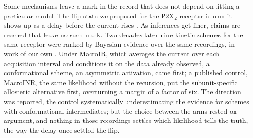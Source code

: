 Some mechanisms leave a mark in the record that does not depend on fitting a particular model. The
flip state we proposed for the P2X$_2$ receptor is one: it shows up as a delay before the current
rises \citep{moffatthume2007responses}. As inferences get finer, claims are reached that leave no
such mark. Two decades later nine kinetic schemes for the same receptor were ranked by Bayesian
evidence over the same recordings, in work of our own \citep{moffatt2025bayesian}. Under MacroIR,
which averages the current over each acquisition interval and conditions it on the data already
observed, a conformational scheme, an asymmetric activation, came first; a published control,
MacroINR, the same likelihood
without the recursion, put the subunit-specific allosteric alternative first, overturning a margin
of a factor of six. The direction was reported, the control systematically underestimating the
evidence for schemes with conformational intermediates; but the choice between the arms rested on
argument, and nothing in those recordings settles which likelihood tells the truth, the way the
delay once settled the flip.
